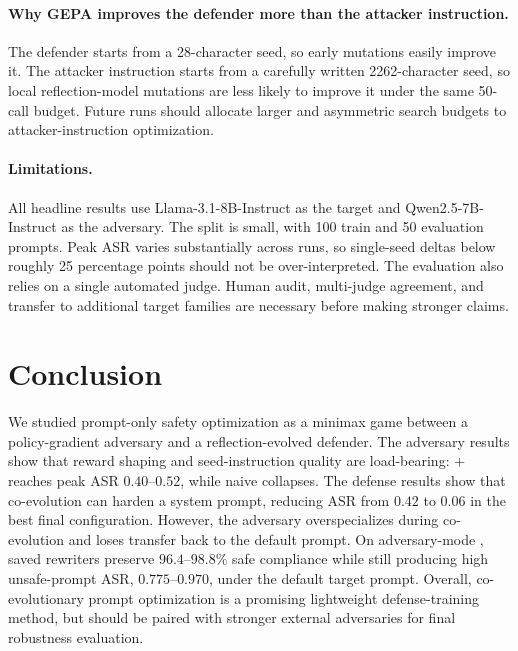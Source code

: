 \paragraph{Why GEPA improves the defender more than the attacker instruction.}
The defender starts from a 28-character seed, so early mutations easily improve it.
The attacker instruction starts from a carefully written 2262-character seed, so local reflection-model mutations are less likely to improve it under the same 50-call budget.
Future runs should allocate larger and asymmetric search budgets to attacker-instruction optimization.
\paragraph{Limitations.}
All headline results use Llama-3.1-8B-Instruct as the target and Qwen2.5-7B-Instruct as the adversary.
The \harmbench{} split is small, with 100 train and 50 evaluation prompts.
Peak ASR varies substantially across runs, so single-seed deltas below roughly 25 percentage points should not be over-interpreted.
The evaluation also relies on a single automated judge. 
Human audit, multi-judge agreement, and transfer to additional target families are necessary before making stronger claims.
\section{Conclusion}

We studied prompt-only safety optimization as a minimax game between a policy-gradient adversary and a reflection-evolved defender.
The adversary results show that reward shaping and seed-instruction quality are load-bearing: \rloo{}+\lp{} reaches peak ASR $0.40$--$0.52$, while naive \reinforce{} collapses.
The defense results show that co-evolution can harden a system prompt, reducing \harmbench{} ASR from $0.42$ to $0.06$ in the best final configuration.
However, the adversary overspecializes during co-evolution and loses transfer back to the default prompt.
On adversary-mode \xstest{}, saved rewriters preserve $96.4$--$98.8\%$ safe compliance while still producing high unsafe-prompt ASR, $0.775$--$0.970$, under the default target prompt.
Overall, co-evolutionary prompt optimization is a promising lightweight defense-training method, but should be paired with stronger external adversaries for final robustness evaluation.




